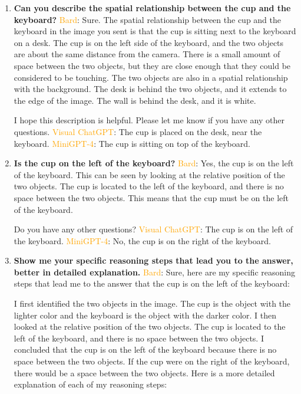     \begin{enumerate}
        \item \textbf{Can you describe the spatial relationship between the cup and the keyboard?}
        \subitem \textcolor{orange}{Bard}: 
        Sure. The spatial relationship between the cup and the keyboard in the image you sent is that the cup is sitting next to the keyboard on a desk. The cup is on the left side of the keyboard, and the two objects are about the same distance from the camera. There is a small amount of space between the two objects, but they are close enough that they could be considered to be touching.
        The two objects are also in a spatial relationship with the background. The desk is behind the two objects, and it extends to the edge of the image. The wall is behind the desk, and it is white.

        I hope this description is helpful. Please let me know if you have any other questions.
        \subitem \textcolor{orange}{Visual ChatGPT}: The cup is placed on the desk, near the keyboard.
        \subitem \textcolor{orange}{MiniGPT-4}: The cup is sitting on top of the keyboard.
        \item \textbf{Is the cup on the left of the keyboard?}
        \subitem \textcolor{orange}{Bard}: 
        Yes, the cup is on the left of the keyboard. This can be seen by looking at the relative position of the two objects. The cup is located to the left of the keyboard, and there is no space between the two objects. This means that the cup must be on the left of the keyboard.
        
        Do you have any other questions?
        \subitem \textcolor{orange}{Visual ChatGPT}: The cup is on the left of the keyboard.
        \subitem \textcolor{orange}{MiniGPT-4}: No, the cup is on the right of the keyboard.
        \item \textbf{Show me your specific reasoning steps that lead you to the answer, better in detailed explanation.}
        \subitem \textcolor{orange}{Bard}:
        Sure, here are my specific reasoning steps that lead me to the answer that the cup is on the left of the keyboard:
        
        I first identified the two objects in the image. The cup is the object with the lighter color and the keyboard is the object with the darker color.
        I then looked at the relative position of the two objects. The cup is located to the left of the keyboard, and there is no space between the two objects.
        I concluded that the cup is on the left of the keyboard because there is no space between the two objects. If the cup were on the right of the keyboard, there would be a space between the two objects.
        Here is a more detailed explanation of each of my reasoning steps:
        

\end{enumerate}
